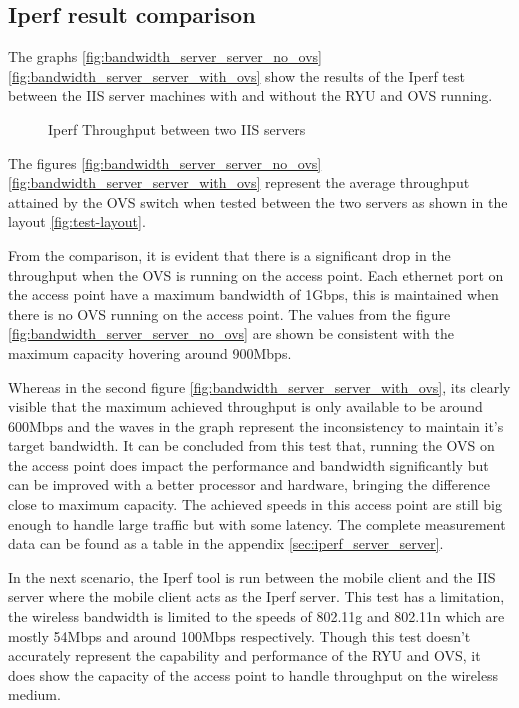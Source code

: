 \subsection{Iperf result comparison}\label{sec:Iperf_result}
The graphs \ref{fig:bandwidth_server_server_no_ovs} \ref{fig:bandwidth_server_server_with_ovs} show the results of the Iperf test between the IIS server machines with and without the RYU and OVS running.

\begin{figure}
	\centering
	\hfill
	\caption{Iperf Throughput between two IIS servers}
\end{figure}

The figures \ref{fig:bandwidth_server_server_no_ovs} \ref{fig:bandwidth_server_server_with_ovs} represent the average throughput attained by the OVS switch when tested between the two servers as shown in the layout \ref{fig:test-layout}.

From the comparison, it is evident that there is a significant drop in the throughput when the OVS is running on the access point. Each ethernet port on the access point have a maximum bandwidth of 1Gbps, this is maintained when there is no OVS running on the access point. The values from the figure \ref{fig:bandwidth_server_server_no_ovs} are shown be consistent with the maximum capacity hovering around 900Mbps. 

Whereas in the second figure \ref{fig:bandwidth_server_server_with_ovs}, its clearly visible that the maximum achieved throughput is only available to be around 600Mbps and the waves in the graph represent the inconsistency to maintain it's target bandwidth. It can be concluded from this test that, running the OVS on the access point does impact the performance and bandwidth significantly but can be improved with a better processor and hardware, bringing the difference close to maximum capacity.  The achieved speeds in this access point are still big enough to handle large traffic but with some latency. The complete measurement data can be found as a table in the appendix \ref{sec:iperf_server_server}.

In the next scenario, the Iperf tool is run between the mobile client and the IIS server where the mobile client acts as the Iperf server. This test has a limitation, the wireless bandwidth is limited to the speeds of 802.11g and 802.11n which are mostly 54Mbps and around 100Mbps respectively. Though this test doesn’t accurately represent the capability and performance of the RYU and OVS, it does show the capacity of the access point to handle throughput on the wireless medium.

